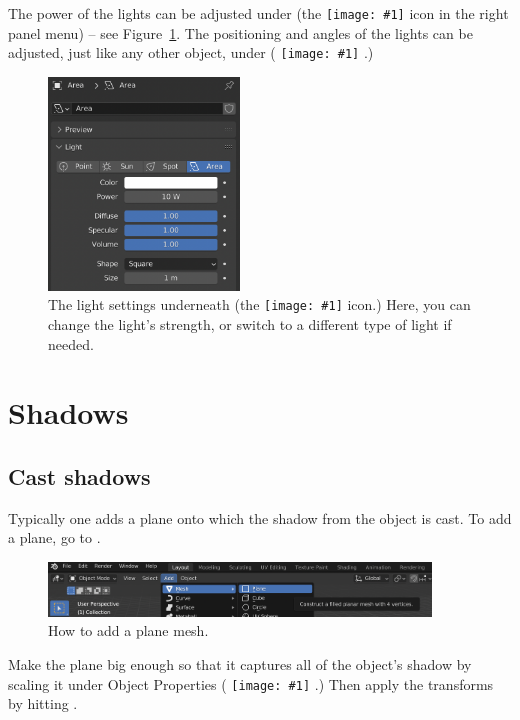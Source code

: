 \documentclass[10pt]{article}
\DeclareRobustCommand{\inlinepic}[1]{%
  \begingroup\normalfont
  \texttt{[image: \#1]}%
  \endgroup
}
\begin{document}
The power of the lights can be adjusted under  (the \inlinepic{images/object-data-properties-light.png} icon in the right panel menu) -- see Figure~\ref{fig:area-light-settings}. The positioning and angles of the lights can be adjusted, just like any other object, under  (\inlinepic{images/object-properties.png}.)

\begin{figure}[H]
    \centering
    \includegraphics[width=2in]{images/area-light-settings.png}
    \caption{The light settings underneath  (the \inlinepic{images/object-data-properties-light.png} icon.) Here, you can change the light's strength, or switch to a different type of light if needed. \label{fig:area-light-settings}}
\end{figure}

\section{Shadows}
\label{sec:Shadows}

\subsection{Cast shadows}
Typically one adds a plane onto which the shadow from the object is cast. To add a plane, go to .
\begin{figure}[H]
    \centering
    \includegraphics[width=4in]{images/add-a-plane-mesh.png}
    \caption{How to add a plane mesh.}
\end{figure}
Make the plane big enough so that it captures all of the object's shadow by scaling it under Object Properties (\inlinepic{images/object-properties-icon.png}.) Then apply the transforms by hitting .
\end{document}
